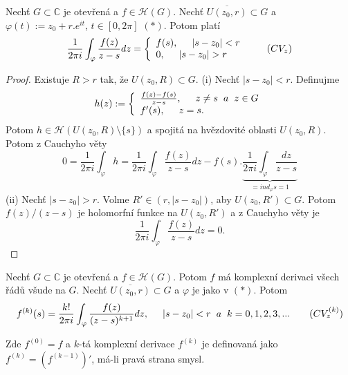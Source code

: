 
\begin{theorem}
Nechť $G\subset{\mathbb{C}}$ je otevřená a $f\in\mathcal{H}(G)$. Nechť $\overline{U(z_0,r)}\subset{G}$ a $\varphi{(t)}:=z_0+r.e^{it}$, $t\in{[0,2\pi]}$ $(*)$. Potom platí 
\begin{equation}
    \frac{1}{2\pi{i}}\int_\varphi{\frac{f(z)}{z-s}dz}=
\left\{
	\begin{array}{ll}
		f(s), \hspace{5mm} |s-z_0|<r\\
		0,\hspace{5mm} |s-z_0|>r
	\end{array}
\right.
\tag{$CV_z$}
\label{eqn:cvz}
\end{equation}
\end{theorem}

\begin{proof}
Existuje $R>r$ tak, že $U(z_0,R)\subset{G}$.\newline
(i) Nechť $|s-z_0|<r$. Definujme 
\[h(z):=
\left\{
	\begin{array}{ll}
		\frac{f(z)-f(s)}{z-s},\hspace{5mm}z\neq{s}\hspace{2mm} a\hspace{2mm} z\in{G}\\
		f'(s),\hspace{5mm}z=s.
	\end{array}
\right.\]
Potom $h\in\mathcal{H}(U(z_0,R)\setminus\{s\})$ a spojitá na hvězdovité oblasti $U(z_0,R)$. Potom z Cauchyho věty 
\[0=
\frac{1}{2\pi{i}}\int_\varphi{h}=
\frac{1}{2\pi{i}}\int_\varphi{\frac{f(z)}{z-s}}dz-f(s).\underbrace{\frac{1}{2\pi{i}}\int_\varphi{\frac{dz}{z-s}}}_{=ind_\varphi{s} = 1}
\]
(ii) Nechť $|s-z_0|>r$. Volme $R'\in(r,|s-z_0|)$, aby $U(z_0,R')\subset{G}$. Potom $f(z)/(z-s)$ je holomorfní funkce na $U(z_0,R')$ a z Cauchyho věty je 
\[\frac{1}{2\pi{i}}\int_\varphi{\frac{f(z)}{z-s}}dz =0.\]
\end{proof}

\begin{consequence}
Nechť $G\subset{\mathbb{C}}$ je otevřená a $f\in\mathcal{H}(G)$. Potom $f$ má komplexní derivaci všech řádů všude na $G$. Nechť $\overline{U(z_0,r)}\subset{G}$ a $\varphi$ je jako v $(*)$. Potom 
\begin{equation}
f^{(k)}(s)=
\frac{k!}{2\pi{i}}\int_\varphi{\frac{f(z)}{(z-s)^{k+1}}}dz,\hspace{5mm} |s-z_0|<r\hspace{2mm} a\hspace{2mm} k = 0,1,2,3,... 
\tag{$CV^{(k)}_z$}
\label{eqn:cvkz}
\end{equation}

Zde $f^{(0)}=f$ a $k$-tá komplexní derivace $f^{(k)}$ je definovaná jako $f^{(k)}=(f^{(k-1)})'$, má-li pravá strana smysl.
\end{consequence}

